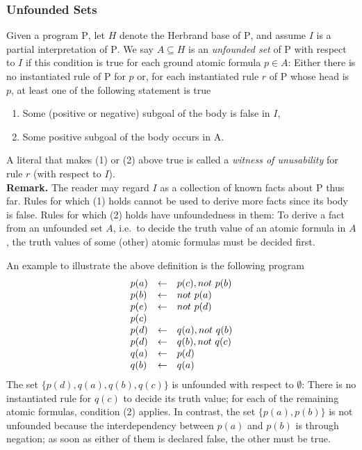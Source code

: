 \subsubsection{Unfounded Sets}
Given a program $\mathrm{P}$, let $H$ denote the Herbrand base of $\mathrm{P}$, and assume $I$ is a partial interpretation of $\mathrm{P}$. We say $A \subseteq H$ is an \emph{unfounded set} of $\mathrm{P}$ with respect to $I$ if this condition is true for each ground atomic formula $p \in A$: Either there is no instantiated rule of $\mathrm{P}$ for $p$ or, for each instantiated rule $r$ of $\mathrm{P}$ whose head is $p$, at least one of the following statement is true
\begin{enumerate}[label=(\arabic*)]
%
\item Some (positive or negative) subgoal of the body is false in $I$,
%
\item Some positive subgoal of the body occurs in A.
%
\end{enumerate}
A literal that makes (1) or (2) above true is called a \emph{witness of unusability} for rule $r$ (with respect to $I$).
\medskip\\
\textbf{Remark.} The reader may regard $I$ as a collection of known facts about $\mathrm{P}$ thus far. Rules for which (1) holds cannot be used to derive more facts since its body is false. Rules for which (2) holds have unfoundedness in them: To derive a fact from an unfounded set $A$, i.e.\ to decide the truth value of an atomic formula in $A$, the truth values of some (other) atomic formulas must be decided first.

An example to illustrate the above definition is the following program
\[
\begin{array}{lll}
p(a) & \leftarrow & p(c), not \ p(b) \cr
p(b) & \leftarrow & not \ p(a) \cr
p(e) & \leftarrow & not \ p(d) \cr
p(c) & \ & \ \cr
p(d) & \leftarrow & q(a), not \ q(b) \cr
p(d) & \leftarrow & q(b), not \ q(c) \cr
q(a) & \leftarrow & p(d) \cr
q(b) & \leftarrow & q(a)
\end{array}
\]
The set $\{p(d), q(a), q(b), q(c)\}$ is unfounded with respect to $\emptyset$: There is no instantiated rule for $q(c)$ to decide its truth value; for each of the remaining atomic formulas, condition (2) applies. In contrast, the set $\{p(a), p(b)\}$ is not unfounded because the interdependency between $p(a)$ and $p(b)$ is through negation; as soon as either of them is declared false, the other must be true.


